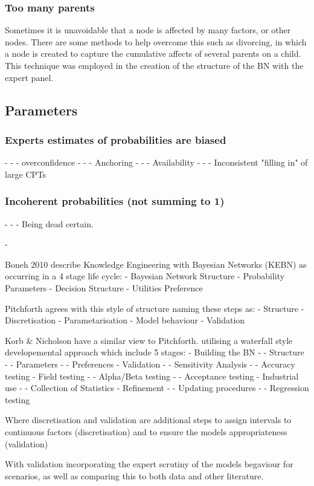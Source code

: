 \subsubsection{Too many parents}
Sometimes it is unavoidable that a node is affected by many factors, or other nodes. There are some methods to help overcome this such as divorcing, in which a node is created to capture the cumulative affects of several parents on a child. This technique was employed in the creation of the structure of the BN with the expert panel.
\subsection{Parameters}
\subsubsection{Experts estimates of probabilities are biased}
-       -       - overconfidence
-       -       - Anchoring
-       -       - Availability
-       -       - Inconsistent "filling in" of large CPTs
\subsubsection{Incoherent probabilities (not summing to 1)}
-       -       - Being dead certain.



- 


Boneh 2010 describe Knowledge Engineering with Bayesian Networks (KEBN) as occurring in a 4 stage life cycle:
- Bayesian Network Structure
- Probability Parameters
- Decision Structure
- Utilities Preference

Pitchforth \citep{pitchforthProposedValidationFramework2013} agrees with this style of structure naming these steps as:
- Structure
- Discretisation
- Parametarisation
- Model behaviour
- Validation

Korb & Nicholson have a similar view to Pitchforth. utilising a waterfall style developemental approach which include 5 stages:
- Building the BN
-       - Structure
-       - Parameters
-       - Preferences
- Validation
-       - Sensitivity Analysis
-       - Accuracy testing
- Field testing
-       - Alpha/Beta testing
-       - Acceptance testing
- Industrial use
-       - Collection of Statistics
- Refinement
-       - Updating procedures
-       - Regression testing



Where discretisation and validation are additional steps to assign intervals to continuous factors (discretisation) and to ensure the models appropriateness (validation)

With validation incorporating the expert scrutiny of the models begaviour for scenarios, as well as comparing this to both data and other literature.



\citep{korbBayesianArtificialIntelligence2011}













